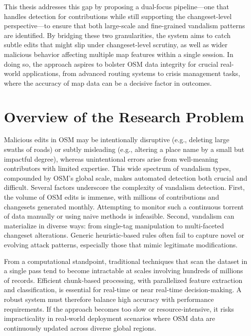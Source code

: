 \documentclass[
    13pt, %
    a4paper, %
    listof=totoc, %
    bibliography=totoc, %
    index=totoc, %
    headsepline
]{scrreprt}
\begin{document}
This thesis addresses this gap by proposing a dual-focus pipeline—one that handles detection for contributions while still supporting the changeset-level perspective—to ensure that both large-scale and fine-grained vandalism patterns are identified. By bridging these two granularities, the system aims to catch subtle edits that might slip under changeset-level scrutiny, as well as wider malicious behavior affecting multiple map features within a single session. In doing so, the approach aspires to bolster OSM data integrity for crucial real-world applications, from advanced routing systems to crisis management tasks, where the accuracy of map data can be a decisive factor in outcomes.


\section{Overview of the Research Problem}
\label{sec:overview_problem}

Malicious edits in OSM may be intentionally disruptive (e.g., deleting large swaths of roads) or subtly misleading (e.g., altering a place name by a small but impactful degree), whereas unintentional errors arise from well-meaning contributors with limited expertise. This wide spectrum of vandalism types, compounded by OSM’s global scale, makes automated detection both crucial and difficult. Several factors underscore the complexity of vandalism detection. First, the volume of OSM edits is immense, with millions of contributions and changesets generated monthly. Attempting to monitor such a continuous torrent of data manually or using naive methods is infeasible. Second, vandalism can materialize in diverse ways: from single-tag manipulation to multi-faceted changeset alterations. Generic heuristic-based rules often fail to capture novel or evolving attack patterns, especially those that mimic legitimate modifications.

From a computational standpoint, traditional techniques that scan the dataset in a single pass tend to become intractable at scales involving hundreds of millions of records. Efficient chunk-based processing, with parallelized feature extraction and classification, is essential for real-time or near real-time decision-making. A robust system must therefore balance high accuracy with performance requirements. If the approach becomes too slow or resource-intensive, it risks impracticality in real-world deployment scenarios where OSM data are continuously updated across diverse global regions.
\end{document}
